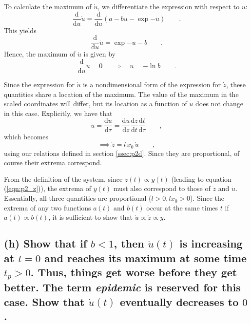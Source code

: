 \documentclass[draft]{agujournal2019}
\begin{document}
To calculate the maximum of $\dot u$, we differentiate the expression with respect to $u$:
\begin{equation*}
    \frac{\mathrm{d}}{\mathrm{d}u} \dot u = \frac{\mathrm{d}}{\mathrm{d}u} \left(a - b u - \exp{-u} \right) \qquad .
\end{equation*}
This yields 
\begin{equation*}
    \frac{\mathrm{d}}{\mathrm{d}u} \dot u = \exp{-u} - b  \qquad .
\end{equation*}
Hence, the maximum of $\dot u$ is given by 
\begin{equation*}
    \frac{\mathrm{d}}{\mathrm{d}u} \dot u = 0 \quad \implies \quad u = -\ln{b}  \qquad .
\end{equation*}

Since the expression for $\dot u$ is a nondimensional form of the expression for $\dot z$, these quantities share a location of the maximum. The value of the maximum in the scaled coordinates will differ, but its location as a function of $u$ does not change in this case. Explicitly, we have that
\begin{equation*}
    \dot u = \frac{\mathrm{d}u}{\mathrm{d}\tau} = \frac{\mathrm{d}u}{\mathrm{d}z} \frac{\mathrm{d}z}{\mathrm{d}t} \frac{\mathrm{d}t}{\mathrm{d}\tau} \qquad ,
\end{equation*}
which becomes 
\begin{equation*}
    \implies \dot z = l\,x_0\,\dot u \qquad ,
\end{equation*}
using our relations defined in section \ref{ssec:p2d}. Since they are proportional, of course their extrema correspond.  
\par
From the definition of the system, since $\dot z(t) \propto y(t)$ (leading to equation (\ref{eqn:p2_z})), the extrema of $y(t)$ must also correspond to those of $\dot z$ and $\dot u$. Essentially, all three quantities are proportional ($l>0,lx_0 > 0$). Since the extrema of any two functions $a(t)$ and $b(t)$ occur at the same times $t$ if $a(t) \propto b(t)$, it is sufficient to show that $\dot u \propto \dot z \propto y$. 




\subsection{(h) Show that if $b<1$, then $\dot u(t)$ is increasing at $t=0$ and reaches its maximum at some time $t_p>0$. Thus, things get worse before they get better. The term \emph{epidemic} is reserved for this case. Show that $\dot u(t)$ eventually decreases to $0$. }
\label{ssec:p2h}
\end{document}
